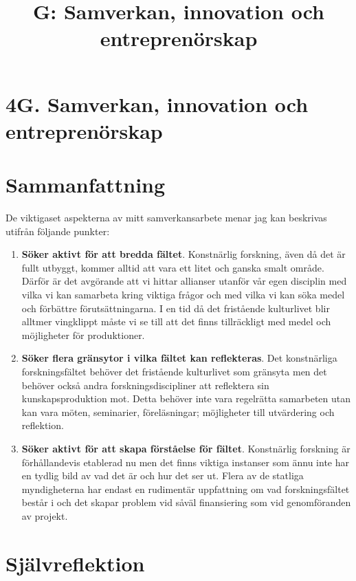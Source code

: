 \documentclass[a4paper]{article}
\title{G: Samverkan, innovation och entreprenörskap}
\date{}
\begin{document}

\thispagestyle{empty}

\section*{\textsf{4G. Samverkan, innovation och entreprenörskap}}

\section*{\textsf{Sammanfattning}}

De viktigaset aspekterna av mitt samverkansarbete menar jag kan beskrivas utifrån följande punkter:

\begin{enumerate}
\item \textbf{Söker aktivt för att bredda fältet}. Konstnärlig forskning, även då det är fullt utbyggt, kommer alltid att vara ett litet och ganska smalt område. Därför är det avgörande att vi hittar allianser utanför vår egen disciplin med vilka vi kan samarbeta kring viktiga frågor och med vilka vi kan söka medel och förbättre förutsättningarna. I en tid då det fristående kulturlivet blir alltmer vingklippt måste vi se till att det finns tillräckligt med medel och möjligheter för produktioner.
\item \textbf{Söker flera gränsytor i vilka fältet kan reflekteras}. Det konstnärliga forskningsfältet behöver det fristående kulturlivet som gränsyta men det behöver också andra forskningsdiscipliner att reflektera sin kunskapsproduktion mot. Detta behöver inte vara regelrätta samarbeten utan kan vara möten, seminarier, föreläsningar; möjligheter till utvärdering och reflektion.
\item \textbf{Söker aktivt för att skapa förståelse för fältet}. Konstnärlig forskning är förhållandevis etablerad nu men det finns viktiga instanser som ännu inte har en tydlig bild av vad det är och hur det ser ut. Flera av de statliga myndigheterna har endast en rudimentär uppfattning om vad forskningsfältet består i och det skapar problem vid såväl finansiering som vid genomföranden av projekt. 
\end{enumerate}

\section*{\textsf{Självreflektion}}
\end{document}
